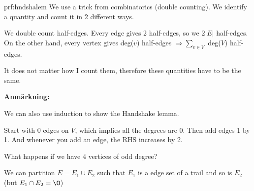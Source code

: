 \begin{prf}{prf:hndshalem}
  We use a trick from combinatorics (double counting). We identify a quantity and count it in 2 different ways.
  \par\bigskip
  \noindent We double count half-edges. Every edge gives 2 half-edges, so we $2\left|E\right|$ half-edges. On the other hand, every vertex gives deg($v$) half-edges $\Rightarrow \sum_{v\in V}$ deg($V$) half-edges.\par
  \noindent It does not matter how I count them, therefore these quantities have to be the same.
\end{prf}
\par\bigskip
\noindent\textbf{Anmärkning:}\par
\noindent We can also use induction to show the Handshake lemma.\par
\noindent Start with 0 edges on $V$, which implies all the degrees are 0. Then add edges 1 by 1. And whenever you add an edge, the RHS increases by 2.
\par\bigskip
\noindent What happens if we have 4 vertices of odd degree?\par
\noindent We can partition $E = E_1\cup E_2$ such that $E_1$ is a edge set of a trail and so is $E_2$ (but $E_1\cap E_2=\O$)

